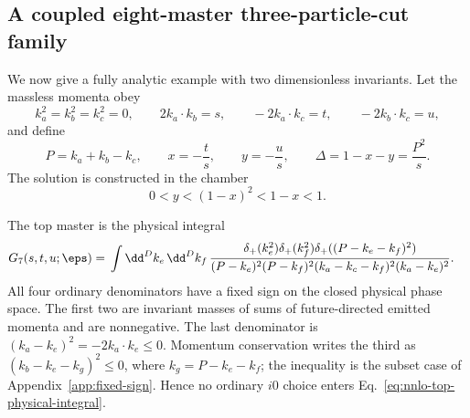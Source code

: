 \subsection{A coupled eight-master three-particle-cut family}

We now give a fully analytic example with two dimensionless invariants.  Let
the massless momenta obey
\begin{equation}
 k_a^2=k_b^2=k_c^2=0,
 \qquad
 2k_a\cdot k_b=s,
 \qquad
 -2k_a\cdot k_c=t,
 \qquad
 -2k_b\cdot k_c=u,
 \label{eq:nnlo-worked-kinematics}
\end{equation}
and define
\begin{equation}
 P=k_a+k_b-k_c,
 \qquad
 x=-\frac{t}{s},
 \qquad
 y=-\frac{u}{s},
 \qquad
 \Delta=1-x-y=\frac{P^2}{s}.
 \label{eq:nnlo-worked-variables}
\end{equation}
The solution is constructed in the chamber
\begin{equation}
 0<y<(1-x)^2<1-x<1.
 \label{eq:nnlo-worked-chamber}
\end{equation}

The top master is the physical integral
\begin{align}
 G_7(s,t,u;\eps)={}&
 \int\dd^Dk_e\,\dd^Dk_f\,
 \frac{
  \delta_+(k_e^2)\delta_+(k_f^2)
  \delta_+((P-k_e-k_f)^2)
 }{
  (P-k_e)^2(P-k_f)^2
  (k_a-k_c-k_f)^2(k_a-k_e)^2}.
 \label{eq:nnlo-top-physical-integral}
\end{align}
All four ordinary denominators have a fixed sign on the closed physical phase
space.  The first two are invariant masses of sums of future-directed emitted
momenta and are nonnegative.  The last denominator is
$(k_a-k_e)^2=-2k_a\cdot k_e\leq0$.  Momentum conservation writes the third
as $(k_b-k_e-k_g)^2\leq0$, where $k_g=P-k_e-k_f$; the inequality is the
subset case of Appendix~\ref{app:fixed-sign}.  Hence no ordinary $i0$
choice enters Eq.~\eqref{eq:nnlo-top-physical-integral}.


